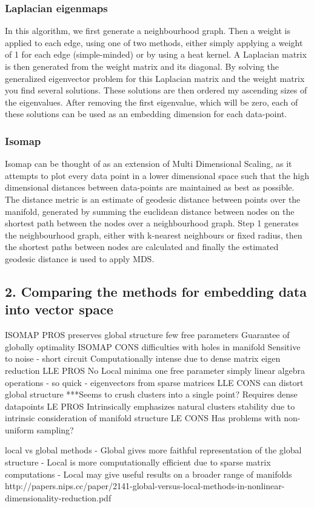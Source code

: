 \documentclass{article}
\begin{document}
\subsubsection{Laplacian eigenmaps}
In this algorithm, we first generate a neighbourhood graph. Then a weight is applied to each edge, using one of two methods, either simply applying a weight of 1 for each edge (simple-minded) or by using a heat kernel. A Laplacian matrix is then generated from the weight matrix and its diagonal. By solving the generalized eigenvector problem for this Laplacian matrix and the weight matrix you find several solutions. These solutions are then ordered my ascending sizes of the eigenvalues. After removing the first eigenvalue, which will be zero, each of these solutions can be used as an embedding dimension for each data-point.
\subsubsection{Isomap}
Isomap can be thought of as an extension of Multi Dimensional Scaling, as it attempts to plot every data point in a lower dimensional space such that the high dimensional distances between data-points are maintained as best as possible. The distance metric is an estimate of geodesic distance between points over the manifold, generated by summing the euclidean distance between nodes on the shortest path between the nodes over a neighbourhood graph. Step 1 generates the neighbourhood graph, either with k-nearest neighbours or fixed radius, then the shortest paths between nodes are calculated and finally the estimated geodesic distance is used to apply MDS.
\subsection{2. Comparing the methods for embedding data into vector space}
ISOMAP PROS
preserves global structure
few free parameters
Guarantee of globally optimality
ISOMAP CONS
difficulties with holes in manifold
Sensitive to noise - short circuit 
Computationally intense due to dense matrix eigen reduction 
LLE PROS
No Local minima
one free parameter
simply linear algebra operations - so quick - eigenvectors from sparse matrices 
LLE CONS
can distort global structure 
***Seems to crush clusters into a single point?
Requires dense datapoints
LE PROS
Intrinsically emphasizes natural clusters 
stability due to intrinsic consideration of manifold structure
LE CONS
Has problems with non-uniform sampling?

local vs global methods
- Global gives more faithful representation of the global structure
- Local is more computationally efficient due to sparse matrix computations 
- Local may give useful results on a broader range of manifolds
http://papers.nips.cc/paper/2141-global-versus-local-methods-in-nonlinear-dimensionality-reduction.pdf
\end{document}
